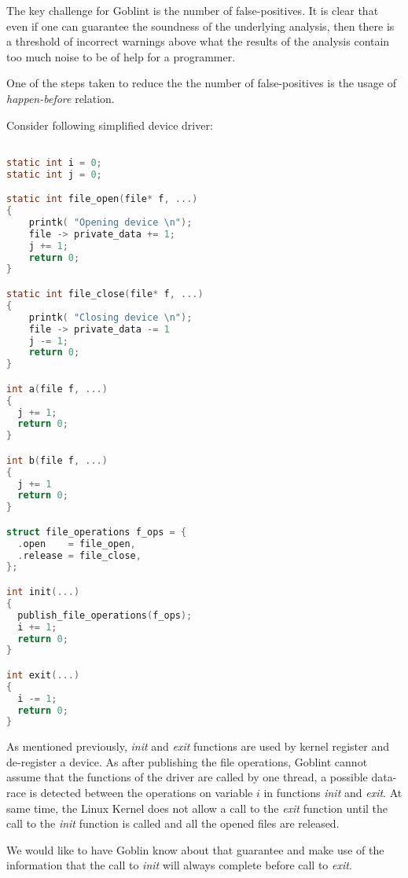 \documentclass[..thesis.tex]{subfiles}
\begin{document}

The key challenge for Goblint is the number of false-positives. It is clear that even if one can guarantee the soundness of the 
underlying analysis, then there is a threshold of incorrect warnings above what the results of the analysis contain too much noise
to be of help for a programmer.


One of the steps taken to reduce the the number of false-positives is the usage of \textit{happen-before} relation.


Consider following simplified device driver:

\begin{lstlisting}[language=c,style=def]

static int i = 0;
static int j = 0;

static int file_open(file* f, ...)
{
    printk( "Opening device \n");
    file -> private_data += 1;
    j += 1;
    return 0;
}

static int file_close(file* f, ...)
{
    printk( "Closing device \n");
    file -> private_data -= 1
    j -= 1;
    return 0;
}

int a(file f, ...)
{
  j += 1;
  return 0;
}

int b(file f, ...)
{
  j += 1
  return 0;
}

struct file_operations f_ops = {
  .open    = file_open,
  .release = file_close,
};

int init(...)
{
  publish_file_operations(f_ops);
  i += 1;
  return 0;
}

int exit(...)
{
  i -= 1;
  return 0;
}

\end{lstlisting}

As mentioned previously, \textit{init} and \textit{exit} functions are used by kernel register and de-register a device. As after publishing the file operations, Goblint cannot assume that the functions of the driver are called by one thread, a possible data-race is detected between the operations on variable $i$ in functions \textit{init} and \textit{exit}. At same time, the Linux Kernel does not allow a call to the \textit{exit} function until the call to the \textit{init} function is called and all the opened files are released.

We would like to have Goblin know about that guarantee and make use of the information that the call to \textit{init} will always complete before call to \textit{exit}.
\end{document}
